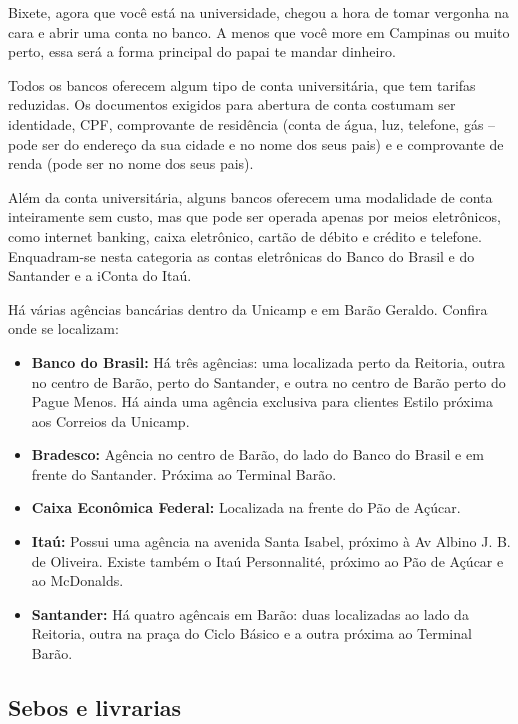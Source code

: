 Bixete, agora que você está na universidade, chegou a hora de tomar vergonha na
cara e abrir uma conta no banco. A menos que você more em Campinas ou muito
perto, essa será a forma principal do papai te mandar dinheiro.

Todos os bancos oferecem algum tipo de conta universitária, que tem tarifas
reduzidas. Os documentos exigidos para abertura de conta costumam ser
identidade, CPF, comprovante de residência (conta de água, luz, telefone, gás
-- pode ser do endereço da sua cidade e no nome dos seus pais) e e comprovante
de renda (pode ser no nome dos seus pais).

Além da conta universitária, alguns bancos oferecem uma modalidade de conta
inteiramente sem custo, mas que pode ser operada apenas por meios eletrônicos,
como internet banking, caixa eletrônico, cartão de débito e crédito e telefone.
Enquadram-se nesta categoria as contas eletrônicas do Banco do Brasil e do
Santander e a iConta do Itaú.

Há várias agências bancárias dentro da Unicamp e em Barão Geraldo. Confira onde
se localizam:

\begin{itemize}
\item \textbf{Banco do Brasil:} Há três agências: uma localizada perto da
  Reitoria, outra no centro de Barão, perto do Santander, e outra no centro de
  Barão perto do Pague Menos. Há ainda uma agência exclusiva para clientes
  Estilo próxima aos Correios da Unicamp.

\item \textbf{Bradesco:} Agência no centro de Barão, do lado do Banco do Brasil
  e em frente do Santander. Próxima ao Terminal Barão.

\item \textbf{Caixa Econômica Federal:} Localizada na frente do Pão de Açúcar.

\item \textbf{Itaú:} Possui uma agência na avenida Santa Isabel, próximo à Av
  Albino J. B. de Oliveira.
  Existe também o Itaú Personnalité, próximo ao Pão de Açúcar e ao McDonalds.

\item \textbf{Santander:} Há quatro agêncais em Barão: duas localizadas ao lado
  da Reitoria, outra na praça do Ciclo Básico e a outra próxima ao Terminal
  Barão.
\end{itemize}

\subsection{Sebos e livrarias}

